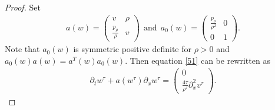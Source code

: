 \documentclass{article}
\theoremstyle{plain}
\begin{document}
\begin{proof}
Set
\begin{eqnarray*}
  a(w) = \left( \begin{array}{cc} v & \rho \\ \frac{p_\rho}{\rho} & v \end{array} \right) \ \ \mbox{and} \ \
  a_0(w) = \left( \begin{array}{cc} \frac{p_\rho}{\rho^2} & 0 \\ 0 & 1 \end{array} \right).
\end{eqnarray*}
Note that $a_0(w)$ is symmetric positive definite for $\rho>0$ and $a_0(w)a(w)=a^T(w)a_0(w)$.
Then equation \eqref{51} can be rewritten as
\begin{eqnarray}\label{57}
  \partial_t w^\tau + a(w^\tau) \partial_x w^\tau = \left( \begin{array}{cc} 0 \\ \frac{4 \tau}{\rho^\tau} \partial^2_x v^\tau \end{array} \right) .
\end{eqnarray}


\end{proof}
\end{document}
